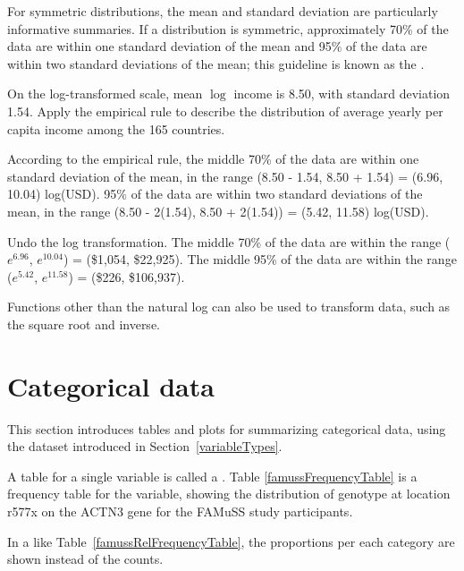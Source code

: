 For symmetric distributions, the mean and standard deviation are particularly informative summaries. If a distribution is symmetric, approximately 70\% of the data are within one standard deviation of the mean and 95\% of the data are within two standard deviations of the mean; this guideline is known as the .

\begin{example}{On the log-transformed scale, mean $\log$ income is 8.50, with standard deviation 1.54. Apply the empirical rule to describe the distribution of average yearly per capita income among the 165 countries.}

According to the empirical rule, the middle 70\% of the data are within one standard deviation of the mean, in the range (8.50 - 1.54, 8.50 + 1.54) = (6.96, 10.04) log(USD). 95\% of the data are within two standard deviations of the mean, in the range (8.50 - 2(1.54), 8.50 + 2(1.54)) = (5.42, 11.58) log(USD). 	

Undo the log transformation. The middle 70\% of the data are within the range ($e^{6.96}$, $e^{10.04}$) = (\$1,054, \$22,925). The middle 95\% of the data are within the range ($e^{5.42}$, $e^{11.58}$) = (\$226, \$106,937).	
\end{example}

Functions other than the natural log can also be used to transform data, such as the square root and inverse.  


\section[Categorical data]{Categorical data}
\label{categoricalData}


This section introduces tables and plots for summarizing categorical data, using the  dataset introduced in Section~\ref{variableTypes}. 

A table for a single variable is called a . Table \ref{famussFrequencyTable} is a frequency table for the  variable, showing the distribution of genotype at location r577x on the ACTN3 gene for the FAMuSS study participants.

In a  like Table~\ref{famussRelFrequencyTable}, the proportions per each category are shown instead of the counts.

